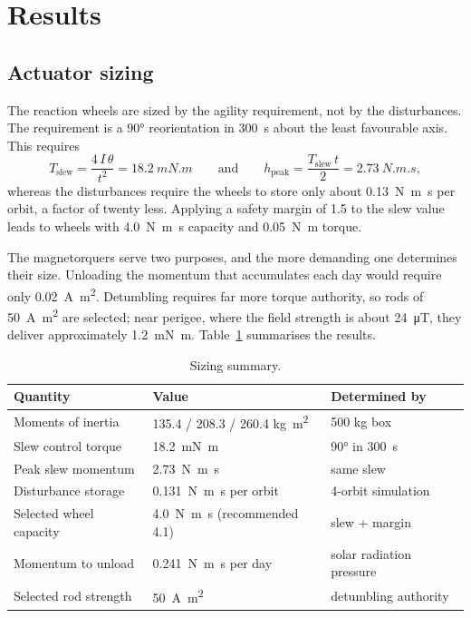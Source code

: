 \documentclass[11pt,a4paper]{article}
\begin{document}
\section{Results}

\subsection{Actuator sizing}\label{sec:sizing}

The reaction wheels are sized by the agility requirement, not by the
disturbances. The requirement is a \ang{90} reorientation in \SI{300}{s}
about the least favourable axis. This requires
\begin{equation}
T_{\mathrm{slew}} = \frac{4\,I\,\theta}{t^2} = \SI{18.2}{mN.m}
\qquad\text{and}\qquad
h_{\mathrm{peak}} = \frac{T_{\mathrm{slew}}\, t}{2} = \SI{2.73}{N.m.s},
\end{equation}
whereas the disturbances require the wheels to store only about
\SI{0.13}{N.m.s} per orbit, a factor of twenty less. Applying a safety
margin of 1.5 to the slew value leads to wheels with \SI{4.0}{N.m.s}
capacity and \SI{0.05}{N.m} torque.

The magnetorquers serve two purposes, and the more demanding one
determines their size. Unloading the momentum that accumulates each day
would require only \SI{0.02}{A.m^2}. Detumbling requires far more torque
authority, so rods of \SI{50}{A.m^2} are selected; near perigee, where
the field strength is about \SI{24}{\micro\tesla}, they deliver
approximately \SI{1.2}{mN.m}. Table~\ref{tab:sizing} summarises the
results.

\begin{table}[H]
\centering\small
\begin{tabular}{@{}lll@{}}
\toprule
\textbf{Quantity} & \textbf{Value} & \textbf{Determined by}\\
\midrule
Moments of inertia & 135.4 / 208.3 / 260.4 \si{kg.m^2} & 500 kg box\\
Slew control torque & \SI{18.2}{mN.m} & \ang{90} in \SI{300}{s}\\
Peak slew momentum & \SI{2.73}{N.m.s} & same slew\\
Disturbance storage & \SI{0.131}{N.m.s} per orbit & 4-orbit simulation\\
Selected wheel capacity & \SI{4.0}{N.m.s} (recommended 4.1) & slew + margin\\
Momentum to unload & \SI{0.241}{N.m.s} per day & solar radiation pressure\\
Selected rod strength & \SI{50}{A.m^2} & detumbling authority\\
\bottomrule
\end{tabular}
\caption{Sizing summary.}
\label{tab:sizing}
\end{table}
\end{document}
